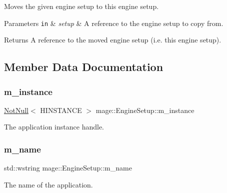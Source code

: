 Moves the given engine setup to this engine setup.


\begin{DoxyParams}[1]{Parameters}
\mbox{\tt in}  & {\em setup} & A reference to the engine setup to copy from. \\
\hline
\end{DoxyParams}
\begin{DoxyReturn}{Returns}
A reference to the moved engine setup (i.\+e. this engine setup). 
\end{DoxyReturn}


\subsection{Member Data Documentation}
\mbox{\label{classmage_1_1_engine_setup_a2461909bce6fe90a75528726ceaf46f9}} 
\subsubsection{\texorpdfstring{m\+\_\+instance}{m\_instance}}
{\footnotesize\ttfamily \mbox{\hyperlink{namespacemage_a8769f9d670d6b585ea306cb1062af94b}{Not\+Null}}$<$ H\+I\+N\+S\+T\+A\+N\+CE $>$ mage\+::\+Engine\+Setup\+::m\+\_\+instance\hspace{0.3cm}{\ttfamily [private]}}

The application instance handle. \mbox{\label{classmage_1_1_engine_setup_a843665f90994d70b6d27698069e4e434}} 
\subsubsection{\texorpdfstring{m\+\_\+name}{m\_name}}
{\footnotesize\ttfamily std\+::wstring mage\+::\+Engine\+Setup\+::m\+\_\+name\hspace{0.3cm}{\ttfamily [private]}}

The name of the application. 